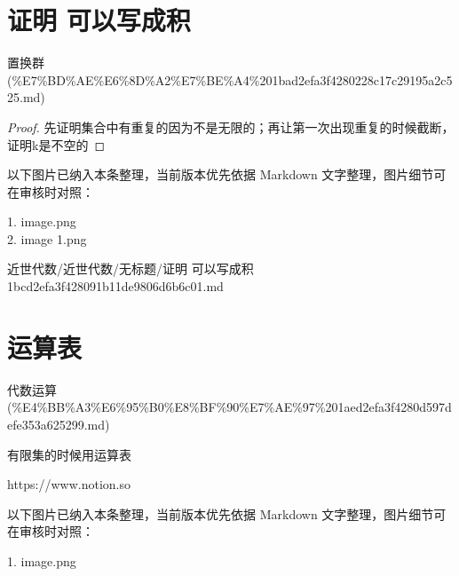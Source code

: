 \section*{证明 可以写成积}

\begin{note}[来源上级主题]

置换群 (\%E7\%BD\%AE\%E6\%8D\%A2\%E7\%BE\%A4\%201bad2efa3f4280228c17c29195a2c525.md)

\end{note}

\begin{proof}

先证明集合中有重复的因为不是无限的；再让第一次出现重复的时候截断，证明k是不空的

\end{proof}

\begin{note}[关联图片]
以下图片已纳入本条整理，当前版本优先依据 Markdown 文字整理，图片细节可在审核时对照：

1. image.png\\
2. image 1.png\\

\end{note}

\begin{note}[来源路径]

近世代数/近世代数/无标题/证明 可以写成积 1bcd2efa3f428091b11de9806d6b6c01.md

\end{note}

\section*{运算表}

\begin{note}[来源上级主题]

代数运算 (\%E4\%BB\%A3\%E6\%95\%B0\%E8\%BF\%90\%E7\%AE\%97\%201aed2efa3f4280d597defe353a625299.md)

\end{note}

\begin{note}[运算表]

有限集的时候用运算表

https://www.notion.so

\end{note}

\begin{note}[关联图片]
以下图片已纳入本条整理，当前版本优先依据 Markdown 文字整理，图片细节可在审核时对照：

1. image.png\\

\end{note}

